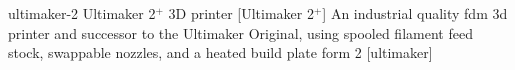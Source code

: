 \newglsXequipment%
{ultimaker-2}%
{Ultimaker 2$^+$ 3D printer}%
[Ultimaker 2$^+$]%
{An industrial quality \gls{fdm} \gls{3d} printer and successor to the Ultimaker Original, using spooled filament feed stock, swappable nozzles, and a heated build plate}%
{form 2}%
[ultimaker]%